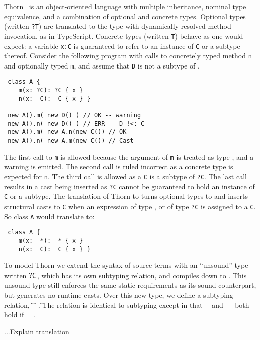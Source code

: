 \documentclass[acmlarge, anonymous, authordraft]{acmart}
\newcommand{\code}[1]{{\tt #1}\xspace}
\begin{document}
Thorn~\cite{oopsla09} is an object-oriented language with multiple inheritance,
nominal type equivalence, and a combination of optional and concrete types.
Optional types (written \code{?T}) are translated to the \any type with
dynamically resolved method invocation, as in TypeScript. Concrete types
(written \code{T}) behave as one would expect: a variable \code{x:C} is
guaranteed to refer to an instance of \code C or a subtype thereof. Consider the
following program with calls to concretely typed method \code n and optionally
typed \code m, and assume that \code D is not a subtype of \C.

\begin{lstlisting}
 class A {
    m(x: ?C): ?C { x }
    n(x:  C):  C { x } }

 new A().m( new D() ) // OK -- warning
 new A().n( new D() ) // ERR -- D !<: C
 new A().m( new A.n(new C()) // OK
 new A().n( new A.m(new C()) // Cast
\end{lstlisting}

\noindent The first call to \code m is allowed because the argument of \code m
is treated as type \any, and a warning is emitted. The second call is ruled
incorrect as a concrete type is expected for \code n. The third call is allowed
as a \code C is a subtype of \code{?C}. The last call results in a cast being
inserted as \code{?C} cannot be guaranteed to hold an instance of \code{C} or a
subtype.  The translation of Thorn to \kafka turns optional types to \any and
inserts structural casts to \code{C} when an expression of type \any, or of type
\code{?C} is assigned to a \code{C}. So class \code A would translate to:

\begin{lstlisting}
 class A {
    m(x:  *):  * { x }
    n(x:  C):  C { x } }
\end{lstlisting}


To model Thorn we extend the syntax of source terms with an ``unsound'' type
written ${\sf{?}}{\sf{C}}$, which has its own subtyping relation, and compiles down to
\any. This unsound type still enforces the same static requirements as its
sound counterpart, but generates no runtime casts.  Over this new type, we
define a subtyping relation, \t~\src\Sub~\t. The relation is identical to
\kafka subtyping except in that \dt\C~\src\Sub~\dt\D and \C~\src\Sub~\dt\D
both hold if \C~\src\Sub~\D.  

...Explain translation
\end{document}
